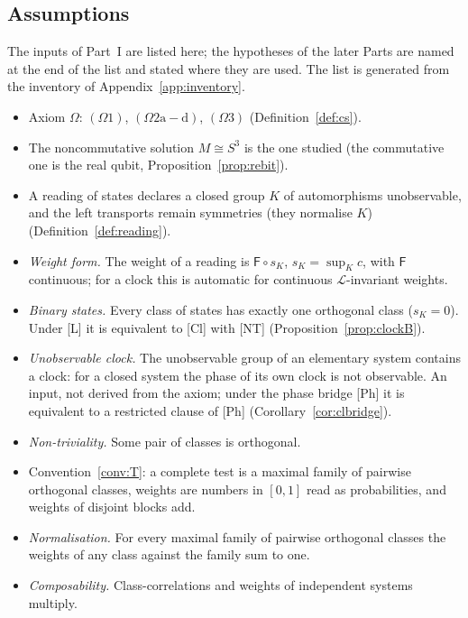 \documentclass[aps,pra,onecolumn,superscriptaddress,nofootinbib,10pt]{revtex4-2}
\theoremstyle{definition}
\theoremstyle{remark}
\newcommand{\cL}{\mathcal{L}}
\begin{document}
\subsection{Assumptions}\label{sec:assumptions}
The inputs of Part~I are listed here; the hypotheses of the later Parts are named at the end of the list and
stated where they are used.  The list is generated from the inventory of Appendix~\ref{app:inventory}.
\begin{itemize}[leftmargin=1.6em]
\item[$(\Omega)$] Axiom $\Omega$: $(\Omega1)$, $(\Omega2\mathrm{a{-}d})$, $(\Omega3)$ (Definition~\ref{def:cs}).
\item[{[NC]}] The noncommutative solution $M\cong S^3$ is the one studied (the commutative one is the real qubit, Proposition~\ref{prop:rebit}).
\item[{[L]}] A reading of states declares a closed group $K$ of automorphisms unobservable, and the left transports remain symmetries (they normalise $K$) (Definition~\ref{def:reading}).
\item[{[W]}] \emph{Weight form.}  The weight of a reading is $\mathsf F\circ s_K$, $s_K=\sup_Kc$, with $\mathsf F$ continuous; for a clock this is automatic for continuous $\cL$-invariant weights.
\item[{[B]}] \emph{Binary states.}  Every class of states has exactly one orthogonal class ($s_K=0$).  Under [L] it is equivalent to [Cl] with [NT] (Proposition~\ref{prop:clockB}).
\item[{[Cl]}] \emph{Unobservable clock.}  The unobservable group of an elementary system contains a clock: for a closed system the phase of its own clock is not observable.  An input, not derived from the axiom; under the phase bridge [Ph] it is equivalent to a restricted clause of [Ph] (Corollary~\ref{cor:clbridge}).
\item[{[NT]}] \emph{Non-triviality.}  Some pair of classes is orthogonal.
\item[{[T]}] Convention~\ref{conv:T}: a complete test is a maximal family of pairwise orthogonal classes, weights are numbers in $[0,1]$ read as probabilities, and weights of disjoint blocks add.
\item[{[N]}] \emph{Normalisation.}  For every maximal family of pairwise orthogonal classes the weights of any class against the family sum to one.
\item[{[Comp]}] \emph{Composability.}  Class-correlations and weights of independent systems multiply.

\end{itemize}
\end{document}
